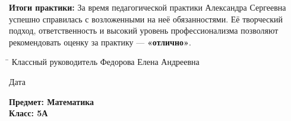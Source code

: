 \documentclass[a4paper,12pt]{article}
\begin{document}
\textbf{Итоги практики:} За время педагогической практики Александра Сергеевна успешно справилась с возложенными на неё обязанностями. Её творческий подход, ответственность и высокий уровень профессионализма позволяют рекомендовать оценку за практику — \textbf{«отлично»}.

\vspace{10mm}

\noindent
\begin{tabbing}
\hspace{5cm} \= \kill
Классный руководитель \> \underline{\hspace{5cm}} Федорова Елена Андреевна
\end{tabbing}
Дата \underline{\hspace{5cm}}

\vspace{5mm}

\noindent
\textbf{Предмет: Математика}\\
\textbf{Класс: 5А}\\
\end{document}
